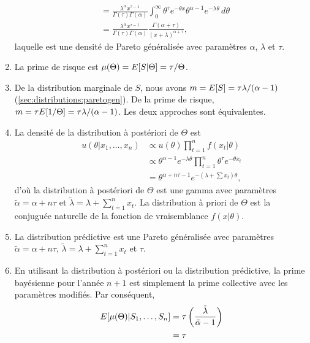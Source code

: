 \begin{exercice}
\begin{sol}
\begin{enumerate}
\begin{align*}
        &= \frac{\lambda^\alpha x^{\tau-1}}{\Gamma(\tau)
          \Gamma(\alpha)} \int_0^\infty \theta^\tau e^{-\theta x}
        \theta^{\alpha-1}
        e^{-\lambda \theta}\, d\theta \\
        &= \frac{\lambda^\alpha x^{\tau-1}}{\Gamma(\tau)
          \Gamma(\alpha)} \frac{\Gamma(\alpha +
          \tau)}{(x+\lambda)^{\alpha + \tau}},
      \end{align*}
      laquelle est une densité de Pareto généralisée avec paramètres
      $\alpha$, $\lambda$ et $\tau$.
    \item La prime de risque est $\mu(\Theta) = E [ S|\Theta ] =
      \tau/\Theta$.
    \item De la distribution marginale de $S$, nous avons
      $m = E [ S ] = \tau \lambda/(\alpha - 1)$
      (\autoref{sec:distributions:paretogen}). De la prime de risque,
      $m = \tau E [ 1/\Theta ] = \tau \lambda/(\alpha - 1)$. Les deux
      approches sont équivalentes.
    \item La densité de la distribution à postériori de $\Theta$ est
      \begin{align*}
        u(\theta|x_1, \dots, x_n)
        &\propto u(\theta) \prod_{t=1}^n f(x_t|\theta) \\
        &\propto \theta^{\alpha-1} e^{-\lambda \theta}
        \prod_{t=1}^n \theta^\tau e^{-\theta x_t} \\
        &= \theta^{\alpha + n\tau-1} e^{-\left(\lambda + \sum x_t\right) \theta},
      \end{align*}
      d'où la distribution à postériori de $\Theta$ est une gamma avec
      paramètres $\tilde{\alpha} = \alpha + n\tau$ et $\tilde{\lambda}
      = \lambda + \sum_{t=1}^n x_t$. La distribution à priori de
      $\Theta$ est la conjuguée naturelle de la fonction de
      vraisemblance $f(x|\theta)$.
    \item La distribution prédictive est une Pareto généralisée avec
      paramètres $\tilde{\alpha} = \alpha + n\tau$, $\tilde{\lambda} =
      \lambda + \sum_{t=1}^n x_t$ et $\tau$.
    \item En utilisant la distribution à postériori ou la distribution
      prédictive, la prime bayésienne pour l'année $n + 1$ est
      simplement la prime collective avec les paramètres modifiés.
      Par conséquent,
      \begin{align*}
        \esp{\mu(\Theta)|S_1, \dots, S_n}
        &= \tau \left(\frac{\tilde{\lambda}}{\tilde{\alpha} - 1}\right) \\
        &= \tau

\end{align*}
\end{enumerate}
\end{sol}
\end{exercice}

